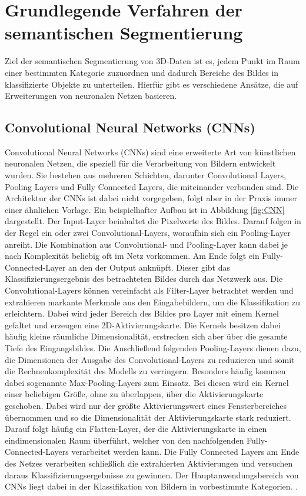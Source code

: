 \chapter{Grundlegende Verfahren der semantischen Segmentierung}

Ziel der semantischen Segmentierung von 3D-Daten ist es, jedem Punkt im Raum
einer bestimmten Kategorie zuzuordnen und dadurch Bereiche des Bildes in
klassifizierte Objekte zu unterteilen. Hierfür gibt es verschiedene Ansätze,
die auf Erweiterungen von neuronalen Netzen basieren.

\section{Convolutional Neural Networks (CNNs)}
Convolutional Neural Networks (CNNs) sind eine erweiterte Art von künstlichen
neuronalen Netzen, die speziell für die Verarbeitung von Bildern entwickelt
wurden. Sie bestehen aus mehreren Schichten, darunter Convolutional Layers,
Pooling Layers und Fully Connected Layers, die miteinander verbunden sind. Die
Architektur der CNNs ist dabei nicht vorgegeben, folgt aber in der Praxis immer
einer ähnlichen Vorlage. Ein beispielhafter Aufbau ist in Abbildung
\ref{fig:CNN} dargestellt. Der Input-Layer beinhaltet die Pixelwerte des
Bildes. Darauf folgen in der Regel ein oder zwei Convolutional-Layers,
woraufhin sich ein Pooling-Layer anreiht. Die Kombination aus Convolutional-
und Pooling-Layer kann dabei je nach Komplexität beliebig oft im Netz
vorkommen. Am Ende folgt ein Fully-Connected-Layer an den der Output anknüpft.
Dieser gibt das Klassifizierungsergebnis des betrachteten Bildes durch das
Netzwerk aus. Die Convolutional-Layers können vereinfacht als Filter-Layer
betrachtet werden und extrahieren markante Merkmale aus den Eingabebildern, um
die Klassifikation zu erleichtern. Dabei wird jeder Bereich des Bildes pro
Layer mit einem Kernel gefaltet und erzeugen eine 2D-Aktivierungskarte. Die
Kernels besitzen dabei häufig kleine räumliche Dimensionalität, erstrecken
sich aber über die gesamte Tiefe des Eingangsbildes. Die Anschließend folgenden
Pooling-Layers dienen dazu, die Dimensionen der Ausgabe des
Convolutional-Layers zu reduzieren und somit die Rechnenkomplexität des Modells
zu verringern. Besonders häufig kommen dabei sogenannte Max-Pooling-Layers zum
Einsatz. Bei diesen wird ein Kernel einer beliebigen Größe, ohne zu überlappen,
über die Aktivierungskarte geschoben. Dabei wird nur der größte
Aktivierungswert eines Fensterbereiches übernommen und so die Dimensionalität
der Aktivierungskarte stark reduziert. Darauf folgt häufig ein Flatten-Layer,
der die Aktivierungskarte in einen eindimensionalen Raum überführt, welcher von
den nachfolgenden Fully-Connected-Layers verarbeitet werden kann. Die Fully
Connected Layers am Ende des Netzes verarbeiten schließlich die extrahierten
Aktivierungen und versuchen daraus Klassifizierungsergebnisse zu gewinnen. Der
Hauptanwendungsbereich von CNNs liegt dabei in der Klassifikation von Bildern
in vorbestimmte Kategorien. \cite{11262015}.


